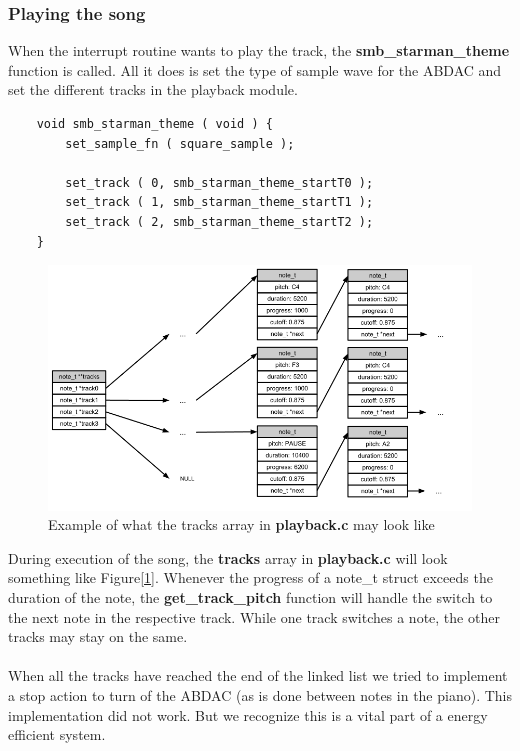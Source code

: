 \subsubsection{Playing the song}
When the interrupt routine wants to play the track, the \textbf{smb\_starman\_theme} function
is called. All it does is set the type of sample wave for the ABDAC and set the
different tracks in the playback module.
\begin{lstlisting}
	void smb_starman_theme ( void ) {
		set_sample_fn ( square_sample );

		set_track ( 0, smb_starman_theme_startT0 );
		set_track ( 1, smb_starman_theme_startT1 );
		set_track ( 2, smb_starman_theme_startT2 );
	}
\end{lstlisting}
\begin{figure}[h]
	\centerline{{\includegraphics[width=480px]{tracks_example02.png}}}
	\caption{Example of what the tracks array in \textbf{playback.c} may look like}
	\label{tracks-example}
\end{figure}
During execution of the song, the \textbf{tracks} array in \textbf{playback.c}
will look something like Figure[\ref{tracks-example}].
Whenever the progress of a note\_t struct exceeds the duration of the note,
the \textbf{get\_track\_pitch} function will handle the switch
to the next note in the respective track. While one
track switches a note, the other tracks may stay on the same. \\
\\
When all the tracks have reached the end of the linked list we tried to implement a
stop action to turn of the ABDAC (as is done between notes in the piano). This implementation
did not work. But we recognize this is a vital part of a energy efficient system.
